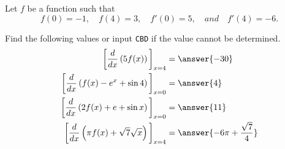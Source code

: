 \documentclass{ximera}
\author{Nela Lakos \and Kyle Parsons}
\begin{document}
\begin{exercise}

Let $f$ be a function such that
\[
f(0) = -1,\quad f(4) = 3,\quad f'(0) = 5,\quad and\quad f'(4) = -6.
\]

Find the following values or input \verb|CBD| if the value cannot be determined.
\begin{align*}
\bigg[ \frac{d}{dx}\left(5f(x)\right) \bigg]_{x=4} &= \answer{-30}\\
\bigg[ \frac{d}{dx}\left(f(x) - e^x + \sin 4\right) \bigg]_{x=0} &= \answer{4}\\
\bigg[ \frac{d}{dx}\left(2f(x) + e + \sin x\right) \bigg]_{x=0} &= \answer{11}\\
\bigg[ \frac{d}{dx}\left(\pi f(x) + \sqrt{7}\sqrt{x}\right) \bigg]_{x=4} &= \answer{-6\pi + \frac{\sqrt{7}}{4}}
\end{align*}

\end{exercise}
\end{document}
